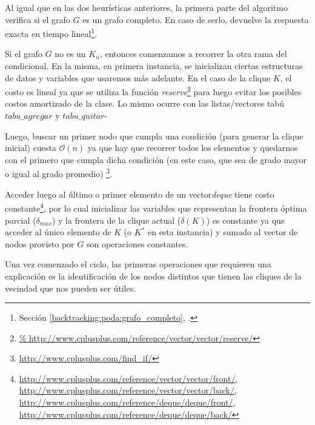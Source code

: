 \bigskip

\par Al igual que en las dos heur\'isticas anteriores, la primera parte
    del algoritmo verifica si el grafo $G$ es un grafo completo. En caso
    de serlo, devuelve la respuesta exacta en tiempo lineal\footnote{%
    Secci\'on \ref{backtracking:poda:grafo_completo},
    \emph{}.}.

\par Si el grafo $G$ no es un $K_n$, entonces comenzamos a recorrer
    la otra rama del condicional. En la misma, en primera instancia,
    se inicializan ciertas estructuras de datos y variables que usaremos
    m\'as adelante. En el caso de la clique $K$, el costo es lineal
    ya que se utiliza la funci\'on \emph{reserve}\footnote{\url{%
    http://www.cplusplus.com/reference/vector/vector/reserve/}} para
    luego evitar los posibles costos amortizado de la clase. Lo mismo
    ocurre con las listas/vectores tab\'u $tabu\_agregar$ y $tabu\_quitar$-

\par Luego, buscar un primer nodo que cumpla una condici\'on (para generar
    la clique inicial) cuesta $\mathcal O(n)$ ya que hay que recorrer
    todos los elementos y quedarnos con el primero que cumpla dicha condici\'on
    (en este caso, que sea de grado mayor o igual al grado promedio)%
    \footnote{\url{http://www.cplusplus.com/find_if/}}.

\par Acceder luego al \'ultimo o primer elemento de un vector\emph{deque} tiene
    costo constante\footnote{%
    \url{http://www.cplusplus.com/reference/vector/vector/front/},%
    \url{http://www.cplusplus.com/reference/vector/vector/back/},%
    \url{http://www.cplusplus.com/reference/deque/deque/front/},%
    \url{http://www.cplusplus.com/reference/deque/deque/back/}}, por lo
    cual inicializar las variables que representan la frontera \'optima
    parcial ($\delta_{max}$) y la frontera de la clique actual ($\delta(K)$)
    es constante ya que acceder al \'unico elemento de $K$ (o $K^*$ en esta
    instancia) y sumado al vector de nodos provisto por $G$ son operaciones
    constantes.

\par Una vez comenzado el ciclo, las primeras operaciones que requieren
    una explicaci\'on es la identificaci\'on de los nodos distintos que tienen
    las cliques de la vecindad que nos pueden ser \'utiles.

